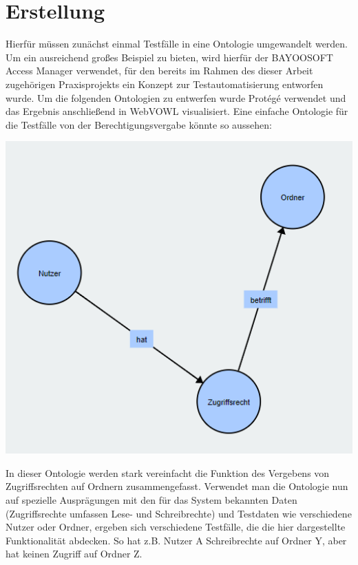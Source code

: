\section{Erstellung}
Hierfür müssen zunächst einmal Testfälle in eine Ontologie umgewandelt werden. Um ein ausreichend großes Beispiel zu bieten, wird hierfür der BAYOOSOFT Access Manager verwendet, für den bereits im Rahmen des dieser Arbeit zugehörigen Praxisprojekts ein Konzept zur Testautomatisierung entworfen wurde. Um die folgenden Ontologien zu entwerfen wurde Protégé verwendet und das Ergebnis anschließend in WebVOWL visualisiert. \newline
Eine einfache Ontologie für die Testfälle von der Berechtigungsvergabe könnte so aussehen:\\

\begin{center}
    \includegraphics[width=1\textwidth]{Thesis/Images/OntologySmall.png}    
\end{center}

In dieser Ontologie werden stark vereinfacht die Funktion des Vergebens von Zugriffsrechten auf Ordnern zusammengefasst. Verwendet man die Ontologie nun auf spezielle Ausprägungen mit den für das System bekannten Daten (Zugriffsrechte umfassen Lese- und Schreibrechte) und Testdaten wie verschiedene Nutzer oder Ordner, ergeben sich verschiedene Testfälle, die die hier dargestellte Funktionalität abdecken. So hat z.B. Nutzer A Schreibrechte auf Ordner Y, aber hat keinen Zugriff auf Ordner Z. \\

